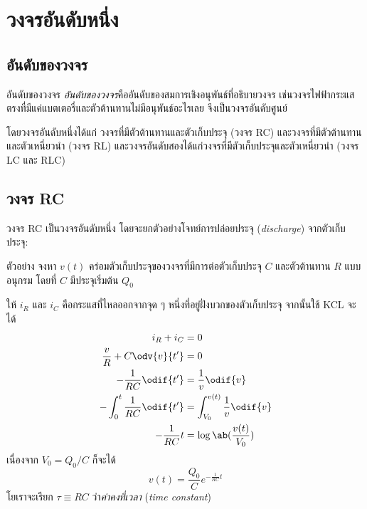 \section{วงจรอันดับหนึ่ง}

\subsection{อันดับของวงจร}

\begin{defbox}{อันดับของวงจร}
    \emph{อันดับของวงจร}คืออันดับของสมการเชิงอนุพันธ์ที่อธิบายวงจร เช่นวงจรไฟฟ้ากระแสตรงที่มีแค่แบตเตอรี่และตัวต้านทานไม่มีอนุพันธ์อะไรเลย จึงเป็นวงจรอันดับศูนย์
\end{defbox}

โดยวงจรอันดับหนึ่งได้แก่ วงจรที่มีตัวต้านทานและตัวเก็บประจุ (วงจร RC) และวงจรที่มีตัวต้านทานและตัวเหนี่ยวนำ (วงจร RL) และวงจรอันดับสองได้แก่วงจรที่มีตัวเก็บประจุและตัวเหนี่ยวนำ (วงจร LC และ RLC)

\subsection{วงจร RC}

วงจร RC เป็นวงจรอันดับหนึ่ง โดยจะยกตัวอย่างโจทย์การปล่อยประจุ (\emph{discharge}) จากตัวเก็บประจุ:

\begin{corbox}{ตัวอย่าง}
    จงหา $v(t)$ คร่อมตัวเก็บประจุของวงจรที่มีการต่อตัวเก็บประจุ $C$ และตัวต้านทาน $R$ แบบอนุกรม โดยที่ $C$ มีประจุเริ่มต้น $Q_0$
\end{corbox}

\begin{soln}
    ให้ $i_R$ และ $i_C$ คือกระแสที่ไหลออกจากจุด ๆ หนึ่งที่อยู่ฝั่งบวกของตัวเก็บประจุ จากนั้นใช้ KCL จะได้
    \begin{align*}
        i_R + i_C &= 0\\
        \frac{v}{R} + C\odv{v}{t'} &= 0\\
        -\frac{1}{RC}\odif{t'} &= \frac{1}{v} \odif{v}\\
        -\int_0^t \frac{1}{RC}\odif{t'} &= \int_{V_0}^{v(t)} \frac{1}{v} \odif{v}\\
        -\frac{1}{RC}t &= \log\ab(\frac{v(t)}{V_0})
    \end{align*}
    เนื่องจาก $V_0 = Q_0 / C$ ก็จะได้
    \[
    v(t) = \frac{Q_0}{C}e^{-\frac{1}{RC}t}
    \]
    โยเราจะเรียก $\tau \equiv RC$ ว่า\emph{ค่าคงที่เวลา} (\emph{time constant})
\end{soln}

